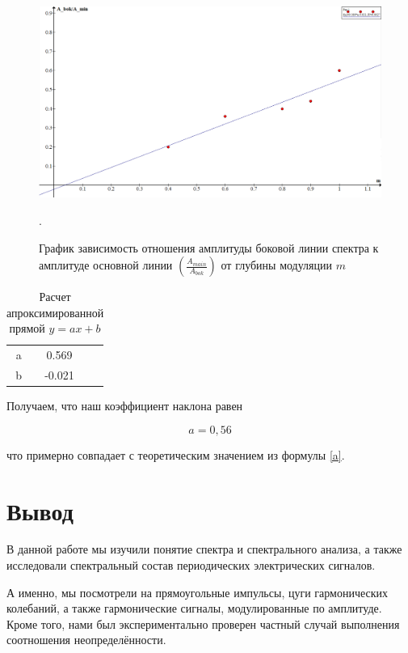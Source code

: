   	\begin{figure}[h!]
  		\label{C_g}
  		\includegraphics[scale=0.47]{pics/lab361_v2.png}
  		\caption{График зависимость отношения амплитуды боковой линии спектра к амплитуде основной линии $ \left( \frac{A_{main}}{A_{bok}}  \right ) $ от глубины модуляции $ m $}. 
  	\end{figure}
  	
  	\begin{table}[h!]
  		\centering
  		\caption{Расчет апроксимированной прямой $ y = ax +b $}
  		\begin{tabular}{c|cc}
  			\text{} & \text{Estimate} & \\
  			\hline
  			a & 0.569 & \\
  			b & -0.021 &  \\
  		\end{tabular}
  	\end{table}
  	
  	Получаем, что наш коэффициент наклона равен
  	
  	\begin{equation}\label{}
  	 a = 0,56 
  	\end{equation}
  	
  	 что примерно совпадает с теоретическим значением из формулы \eqref{a}. 
  	
  	\section{Вывод}
  	
  	В данной работе мы изучили понятие спектра и спектрального анализа, а также исследовали спектральный состав периодических электрических сигналов. 
  	
  	А именно, мы посмотрели на прямоугольные импульсы, цуги гармонических колебаний, а также гармонические сигналы, модулированные по амплитуде. Кроме того, нами был экспериментально проверен частный случай выполнения соотношения неопределённости. 
  
